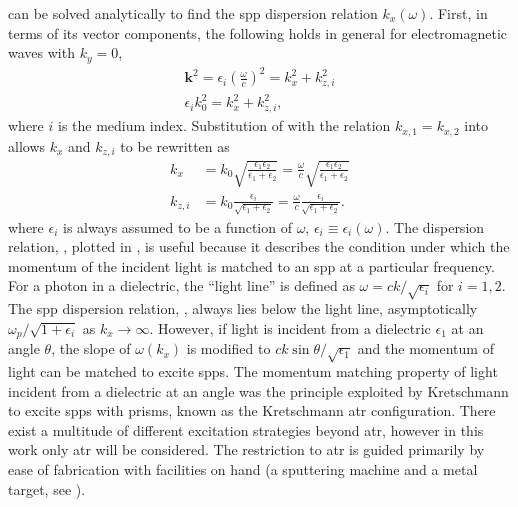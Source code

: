  can be solved analytically to find the \gls{spp}
dispersion relation $k_x(\omega)$.
First, in terms of its vector components, the following holds in general
for electromagnetic waves with $k_y=0$,
\begin{align}
\mathbf{k}^2=\epsilon_i {\left(\frac{\omega}{c}\right)}^2=k_x^2 + k_{z,i}^2\\
\epsilon_i k_0^2=k_x^2 + k_{z,i}^2,
\label{eqn:dispersion1}
\end{align}
where $i$ is the medium index.
Substitution of  with the relation
$k_{x,1}=k_{x,2}$ into  allows
$k_x$ and $k_{z,i}$ to be rewritten as
\begin{align}
k_x &= k_0\sqrt{\frac{\epsilon_1 \epsilon_2}{\epsilon_1+\epsilon_2}}
= \frac{\omega}{c}\sqrt{\frac{\epsilon_1
\epsilon_2}{\epsilon_1+\epsilon_2}} \label{eqn:kayexx}\\
k_{z,i} &= k_0\frac{\epsilon_i}{\sqrt{\epsilon_1+\epsilon_2}}
= \frac{\omega}{c}\frac{\epsilon_i}{\sqrt{\epsilon_1+\epsilon_2}}.
\label{eqn:dandangus}
\end{align}
where $\epsilon_i$ is always assumed to be a function of $\omega$,
$\epsilon_i\equiv\epsilon_i(\omega)$.  The dispersion relation,
, plotted in , is
useful because it describes the condition under which the momentum of the
incident light is matched to an \gls{spp} at a particular frequency.  For a
photon in a dielectric, the ``light line'' is defined as $\omega = c k
/\sqrt{\epsilon_i}$ for $i=1,2$.  The \gls{spp} dispersion relation,
, always lies below the light line,
asymptotically $\omega_p/\sqrt{1+\epsilon_i}$ as $k_x\to\infty$.
However, if light is incident from a dielectric $\epsilon_1$ at an angle
$\theta$, the slope of $\omega(k_x)$ is modified to $c k \sin
\theta/\sqrt{\epsilon_1}$ and the momentum of light can be matched to
excite \glspl{spp}.  The momentum matching property of light incident from a
dielectric at an angle was the principle exploited by Kretschmann
\cite{kretschmann1968} to excite \glspl{spp} with prisms, known as the Kretschmann \gls{atr} configuration.  There exist a multitude of
different excitation strategies beyond \gls{atr}, however in this work only \gls{atr}
will be considered.  The restriction to \gls{atr} is guided primarily by ease of
fabrication with facilities on hand (a sputtering machine and a metal
target, see ).

